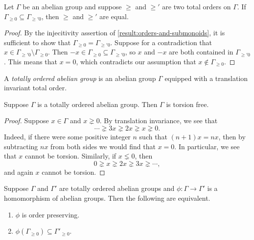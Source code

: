 \begin{lemma}
\label{result:positive-cones-disjoint}
Let $\Gamma$ be an abelian group and suppose $\geq$ and $\geq'$ are two total orders on $\Gamma$. If $\Gamma_{\geq 0} \subseteq \Gamma_{\geq' 0}$, then $\geq$ and $\geq'$ are equal. 
\end{lemma}

\begin{proof}
By the injecitivity assertion of \cref{result:orders-and-submonoids}, it is sufficient to show that $\Gamma_{\geq 0} = \Gamma_{\geq' 0}$. Suppose for a contradiction that $x \in \Gamma_{\geq' 0} \setminus \Gamma_{\geq 0}$. Then $-x \in \Gamma_{\geq 0} \subseteq \Gamma_{\geq' 0}$, so $x$ and $-x$ are both contained in $\Gamma_{\geq' 0}$. This means that $x = 0$, which contradicts our assumption that $x \notin \Gamma_{\geq 0}$. 
\end{proof}

\begin{definition}
\label{definition:totally-ordered-abelian-group}
A \emph{totally ordered abelian group} is an abelian group $\Gamma$ equipped with a translation invariant total order.
\end{definition}

\begin{lemma}
	\label{result:ordered-group-torsion-free}
	Suppose $\Gamma$ is a totally ordered abelian group. Then $\Gamma$ is torsion free.
\end{lemma}

\begin{proof}
	Suppose $x \in \Gamma$ and $x \gneq 0$. By translation invariance, we see that
	\[ \dotsb \gneq 3x \gneq 2x \gneq x \gneq 0. \]
	Indeed, if there were some positive integer $n$ such that $(n+1)x = nx$, then by subtracting $nx$ from both sides we would find that $x = 0$. In particular, we see that $x$ cannot be torsion. Similarly, if $x \lneq 0$, then 
	\[ 0 \gneq x \gneq 2x \gneq 3x \gneq \dotsb, \]
	and again $x$ cannot be torsion. 
\end{proof}

\begin{lemma}
\label{result:order-preserving-submonoid}
Suppose $\Gamma$ and $\Gamma'$ are totally ordered abelian groups and $\phi : \Gamma \to \Gamma'$ is a homomorphism of abelian groups. Then the following are equivalent.
\begin{enumerate}[label=(\alph{*})]
\item $\phi$ is order preserving.
\item $\phi(\Gamma_{\geq 0}) \subseteq \Gamma'_{\geq 0}$. 
\end{enumerate}
\end{lemma}

